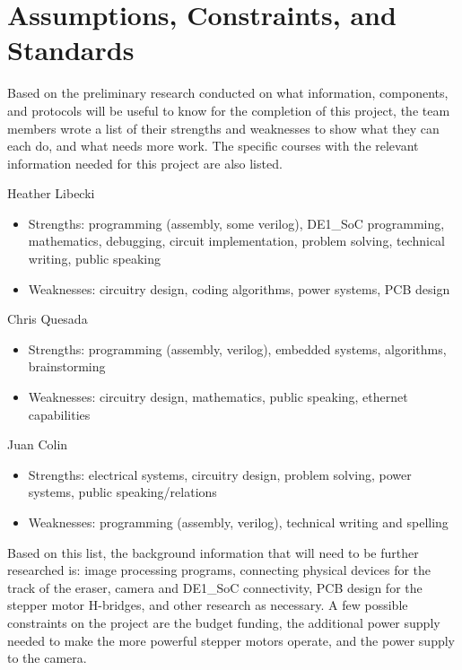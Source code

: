 \section{Assumptions, Constraints, and Standards}
Based on the preliminary research conducted on what information, components, and protocols will be useful to know for the completion of this project, the team members wrote a list of their strengths and weaknesses to show what they can each do, and what needs more work. The specific courses with the relevant information needed for this project are also listed. \\ \par
\setlength{\parindent}{2.5ex} Heather Libecki
\begin{itemize}
	\item Strengths: programming (assembly, some verilog), DE1\_SoC programming, mathematics, debugging, circuit implementation, problem solving, technical writing, public speaking
	\item Weaknesses: circuitry design, coding algorithms, power systems, PCB design \\ 
\end{itemize} \par
\setlength{\parindent}{2.5ex} Chris Quesada
\begin{itemize}
\item Strengths: programming (assembly, verilog), embedded systems, algorithms, brainstorming
\item Weaknesses: circuitry design, mathematics, public speaking, ethernet capabilities \\ 
\end{itemize} \par
\setlength{\parindent}{2.5ex} Juan Colin
\begin{itemize}
\item Strengths: electrical systems, circuitry design, problem solving, power systems, public speaking/relations
\item Weaknesses: programming (assembly, verilog), technical writing and spelling \\
\end{itemize}

Based on this list, the background information that will need to be further researched is: image processing programs, connecting physical devices for the track of the eraser, camera and DE1\_SoC connectivity, PCB design for the stepper motor H-bridges, and other research as necessary. A few possible constraints on the project are the budget funding, the additional power supply needed to make the more powerful stepper motors operate, and the power supply to the camera.

